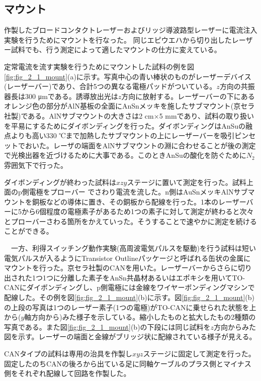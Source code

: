 \subsection{マウント}%
作製したブロードコンタクトレーザーおよびリッジ導波路型レーザーに電流注入実験を行うためにマウントを行なった。
同じエピウエハから切り出したレーザー試料でも、行う測定によって適したマウントの仕方に変えている。


定常電流を流す実験を行うためにマウントした試料の例を図\ref{fig:fig_2_1_mount}(a)に示す。写真中心の青い棒状のものがレーザーデバイス(レーザーバー)であり、合計5つの異なる電極パッドがついている。$z$方向の共振器長は300 \si{\micro\metre}である。誘導放出光は$z$方向に放射する。レーザーバーの下にあるオレンジ色の部分がAlN基板の全面にAnSnメッキを施したサブマウント(京セラ社製)である。AlNサブマウントの大きさは2 cm×5 mmであり、試料の取り扱いを平易にするためにダイボンディングを行った。ダイボンディングはAnSuの融点よりも高い330 ℃まで加熱したサブマウントの上にレーザーバーを吸引ピンセットでおいた。レーザの端面をAlNサブマウントの淵に合わせることが後の測定で光検出器を近づけるために大事である。このときAnSuの酸化を防ぐために$N_{2}$雰囲気下で行った。


ダイボンディングが終わった試料は$xzy$ステージに置いて測定を行った。試料上面のp側電極をプローバー
でさわり電流を流した。n側はAuSnメッキAlNサブマウントを銅板などの導体に置き、その銅板から配線を行った。1本のレーザーバーに5から6個程度の電極素子があるため1つの素子に対して測定が終わると次々とプローバーさわる箇所をかえていった。そうすることで速やかに測定を続けることができる。


　一方、利得スイッチング動作実験(高周波電気パルスを駆動)を行う試料は短い電気パルスが入るようにTransistor Outlineパッケージと呼ばれる缶状の金属にマウントを行った。京セラ社製のCANを用いた。レーザーバーからさらに切り出された1つ1つに分離した素子をAnSn共晶材あるいはエポキシを用いてTO-CANにダイボンディングし、p側電極には金線をワイヤーボンディングマシンで配線した。その例を図\ref{fig:fig_2_1_mount}(b)に示す。図\ref{fig:fig_2_1_mount}(b)の上段の写真は1つのレーザー素子(1つの電極)がTO-CANに乗せられた状態を上から($y$軸方向から)みた様子を示している。縮小したものと拡大したもの2種類の写真である。また図\ref{fig:fig_2_1_mount}(b)の下段には同じ試料を$z$方向からみた図を示す。レーザーの端面と金線がブリッジ状に配線されている様子が見える。

CANタイプの試料は専用の治具を作製し$xyz$ステージに固定して測定を行った。固定したのちCANの後ろから出ている足に同軸ケーブルのプラス側とマイナス側をそれぞれ配線して回路を作製した。

